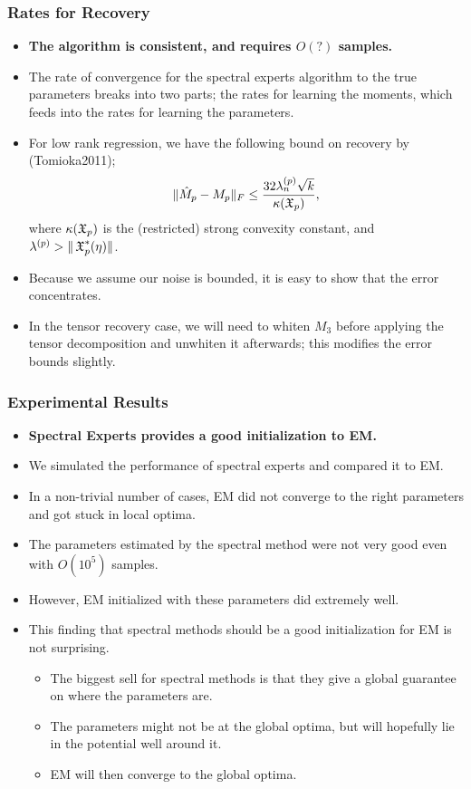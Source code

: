 \documentclass[xcolor={svgnames}]{beamer}
\begin{document}
\begin{frame}
  \frametitle{Rates for Recovery}
  \begin{itemize}
    \item {\bf The algorithm is consistent, and requires $O(?)$ samples.}
\item The rate of convergence for the spectral experts algorithm to the
true parameters breaks into two parts; the rates for learning the
moments, which feeds into the rates for learning the parameters.
\item For low rank regression, we have the following bound on recovery by (Tomioka2011);
  $$ \| \hat M_p - M_p \|_F \le \frac{32 \lambda^{(p)}_n \sqrt{k}}{\kappa(\operatorname{\mathfrak{X}}_p)}, $$
where $\kappa(\operatorname{\mathfrak{X}}_p)$ is the (restricted) strong convexity constant, and $\lambda^{(p)} > \|\operatorname{\mathfrak{X}}^*_p(\eta)\|$. 
\item Because we assume our noise is bounded, it is easy to show that the error concentrates. 
\item In the tensor recovery case, we will need to whiten $M_3$ before
applying the tensor decomposition and unwhiten it afterwards; this
modifies the error bounds slightly.
  \end{itemize}
\end{frame}

\begin{frame}
  \frametitle{Experimental Results}
  \begin{itemize}
    \item {\bf Spectral Experts provides a good initialization to EM.}
      \item We simulated the performance of spectral experts and compared it to EM. 
\item In a non-trivial number of cases, EM did not converge to the right parameters and got stuck in local optima.
\item The parameters estimated by the spectral method were not very good even with $O(10^5)$ samples.
\item However, EM initialized with these parameters did extremely well. 
\item This finding that spectral methods should be a good initialization for EM is not surprising.
  \begin{itemize}
    \item The biggest sell for spectral methods is that they give a global guarantee on where the parameters are.
    \item The parameters might not be at the global optima, but will hopefully lie in the potential well around it.
    \item EM will then converge to the global optima.
  \end{itemize}
  \end{itemize}
\end{frame}
\end{document}
